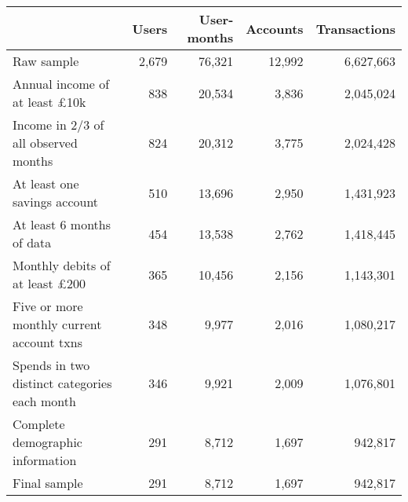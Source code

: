 \begin{tabular}{lrrrr}
\toprule
                                             & Users & User-months & Accounts & Transactions \\
\midrule
                                  Raw sample & 2,679 &      76,321 &   12,992 &    6,627,663 \\
        Annual income of at least \pounds10k &   838 &      20,534 &    3,836 &    2,045,024 \\
        Income in 2/3 of all observed months &   824 &      20,312 &    3,775 &    2,024,428 \\
                At least one savings account &   510 &      13,696 &    2,950 &    1,431,923 \\
                   At least 6 months of data &   454 &      13,538 &    2,762 &    1,418,445 \\
       Monthly debits of at least \pounds200 &   365 &      10,456 &    2,156 &    1,143,301 \\
   Five or more monthly current account txns &   348 &       9,977 &    2,016 &    1,080,217 \\
Spends in two distinct categories each month &   346 &       9,921 &    2,009 &    1,076,801 \\
            Complete demographic information &   291 &       8,712 &    1,697 &      942,817 \\
                                Final sample &   291 &       8,712 &    1,697 &      942,817 \\
\bottomrule
\end{tabular}
